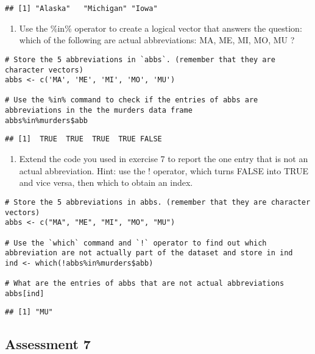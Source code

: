 \documentclass[
]{article}
\providecommand{\tightlist}{%
  \setlength{\itemsep}{0pt}\setlength{\parskip}{0pt}}
\begin{document}
\begin{verbatim}
## [1] "Alaska"   "Michigan" "Iowa"
\end{verbatim}

\begin{enumerate}
\def\labelenumi{\arabic{enumi}.}
\setcounter{enumi}{6}
\tightlist
\item
  Use the \%in\% operator to create a logical vector that answers the
  question: which of the following are actual abbreviations: MA, ME, MI,
  MO, MU ?
\end{enumerate}

\begin{verbatim}
# Store the 5 abbreviations in `abbs`. (remember that they are character vectors)
abbs <- c('MA', 'ME', 'MI', 'MO', 'MU')

# Use the %in% command to check if the entries of abbs are abbreviations in the the murders data frame
abbs%in%murders$abb
\end{verbatim}

\begin{verbatim}
## [1]  TRUE  TRUE  TRUE  TRUE FALSE
\end{verbatim}

\begin{enumerate}
\def\labelenumi{\arabic{enumi}.}
\setcounter{enumi}{7}
\tightlist
\item
  Extend the code you used in exercise 7 to report the one entry that is
  not an actual abbreviation. Hint: use the ! operator, which turns
  FALSE into TRUE and vice versa, then which to obtain an index.
\end{enumerate}

\begin{verbatim}
# Store the 5 abbreviations in abbs. (remember that they are character vectors)
abbs <- c("MA", "ME", "MI", "MO", "MU") 

# Use the `which` command and `!` operator to find out which abbreviation are not actually part of the dataset and store in ind
ind <- which(!abbs%in%murders$abb)

# What are the entries of abbs that are not actual abbreviations
abbs[ind]
\end{verbatim}

\begin{verbatim}
## [1] "MU"
\end{verbatim}

\hypertarget{assessment-7}{%
\subsection{Assessment 7}\label{assessment-7}}
\end{document}
